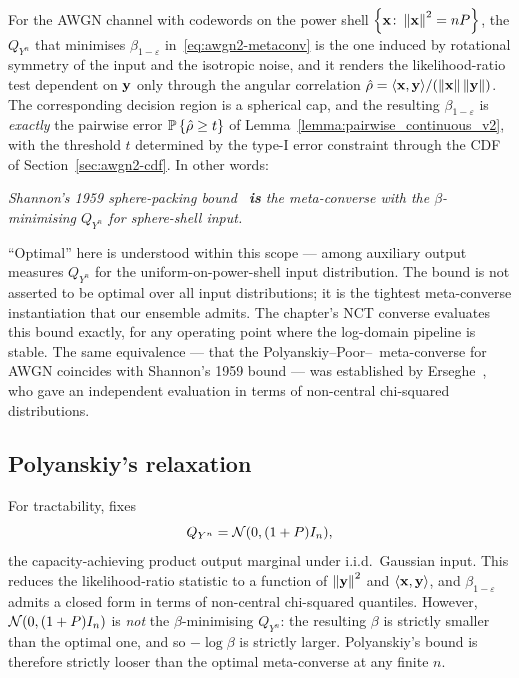 For the AWGN channel with codewords on the power shell $\left\{ \mathbf{x}\colon\left\Vert \mathbf{x} \right\Vert^2 = nP \right \}$, the $Q_{Y^n}$ that minimises $\beta_{1-\varepsilon}$ in~\eqref{eq:awgn2-metaconv} is the one induced by rotational symmetry of the input and the isotropic noise, and it renders the likelihood-ratio test dependent on $\mathbf{y}$ only through the angular correlation $\hat\rho = \langle \mathbf{x},\mathbf{y} \rangle/(\left\Vert \mathbf{x} \right\Vert\left\Vert \mathbf{y} \right\Vert)$.  The corresponding decision region is a spherical cap, and the resulting $\beta_{1-\varepsilon}$ is \emph{exactly} the pairwise error $\mathbb{P}\left\{ \hat\rho \ge t \right\}$ of Lemma~\ref{lemma:pairwise_continuous_v2}, with the threshold $t$ determined by the type-I error constraint through the CDF of Section~\ref{sec:awgn2-cdf}.  In other words:
\begin{center}
	\emph{Shannon's 1959 sphere-packing bound~\cite{shannon1959probability} \textbf{is} the meta-converse with the $\beta$-minimising $Q_{Y^n}$ for sphere-shell input.}
\end{center}
``Optimal'' here is understood within this scope --- among auxiliary output measures $Q_{Y^n}$ for the uniform-on-power-shell input distribution.  The bound is not asserted to be optimal over all input distributions; it is the tightest meta-converse instantiation that our ensemble admits.  The chapter's NCT converse evaluates this bound exactly, for any operating point where the log-domain pipeline is stable.  The same equivalence --- that the Polyanskiy--Poor--\verdu\ meta-converse for AWGN coincides with Shannon's 1959 bound --- was established by Erseghe~\cite{erseghe2015evaluation}, who gave an independent evaluation in terms of non-central chi-squared distributions.

\subsection{Polyanskiy's relaxation}

For tractability, \cite[\S~IV-B]{polyanskiy2010channel} fixes
\begin{equation*}
	Q_{Y^n} = \mathcal{N}(0, (1+P) I_n),
\end{equation*}
the capacity-achieving product output marginal under i.i.d.\ Gaussian input.  This reduces the likelihood-ratio statistic to a function of $\left\Vert \mathbf{y} \right\Vert^2$ and $\langle \mathbf{x}, \mathbf{y} \rangle$, and $\beta_{1-\varepsilon}$ admits a closed form in terms of non-central chi-squared quantiles.  However, $\mathcal{N}(0,(1+P)I_n)$ is \emph{not} the $\beta$-minimising $Q_{Y^n}$: the resulting $\beta$ is strictly smaller than the optimal one, and so $-\log\beta$ is strictly larger.  Polyanskiy's bound is therefore strictly looser than the optimal meta-converse at any finite $n$.

